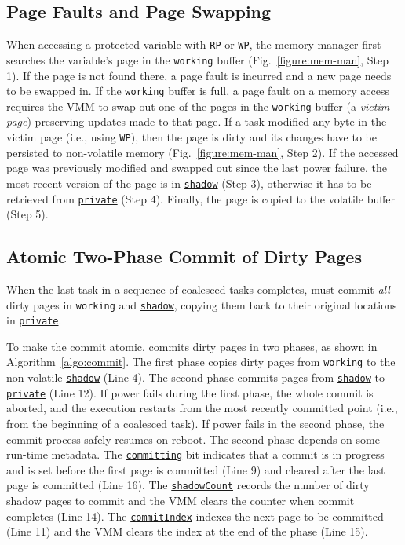 \subsection{Page Faults and Page Swapping}

When accessing a protected variable with \texttt{RP} or \texttt{WP}, the memory manager first searches the variable's page in the \texttt{working} buffer (Fig.~\ref{figure:mem-man}, Step 1).
If the page is not found there, a page fault is incurred and a new page needs to be swapped in.
If the \texttt{working} buffer is full, a page fault on a memory access requires the VMM to swap out one of the pages in the \texttt{working} buffer (a \emph{victim page}) preserving updates made to that page.
If a task modified any byte in the victim page (i.e., using \texttt{WP}), then the page is dirty and its changes have to be persisted to non-volatile memory (Fig.~\ref{figure:mem-man}, Step 2). If the accessed page was previously modified and swapped out since the last power failure, the most recent version of the page is in {\tt \underline{shadow}} (Step 3), otherwise it has to be retrieved from {\tt \underline{private}} (Step 4). Finally, the page is copied to the volatile buffer (Step 5).

\subsection{Atomic Two-Phase Commit of Dirty Pages}

When the last task in a sequence of coalesced tasks completes, \sys must commit \emph{all} dirty pages in \texttt{working} and \texttt{\underline{shadow}}, copying them back to their original locations in \texttt{\underline{private}}. 

To make the commit atomic, \sys commits dirty pages in two phases, as shown in Algorithm~\ref{algo:commit}. The first phase copies dirty pages from \texttt{working} to the non-volatile \texttt{\underline{shadow}} (Line 4). The second phase commits pages from \texttt{\underline{shadow}} to \texttt{\underline{private}} (Line 12).  If power fails during the first phase, the whole commit is aborted, and the execution restarts from the most recently committed point (i.e., from the beginning of a coalesced task). If power fails in the second
phase, the commit process safely resumes on reboot.  The second phase depends on some run-time metadata. The \texttt{\underline{committing}} bit indicates that a commit is in progress and is set before the first page is committed (Line 9) and cleared after the last page is committed (Line 16).  The \texttt{\underline{shadowCount}} records the number of dirty shadow pages to commit and the VMM clears the counter when commit completes (Line 14). The \texttt{\underline{commitIndex}} indexes the next page to be committed (Line 11) and the VMM clears the index at the end of the phase (Line 15).

